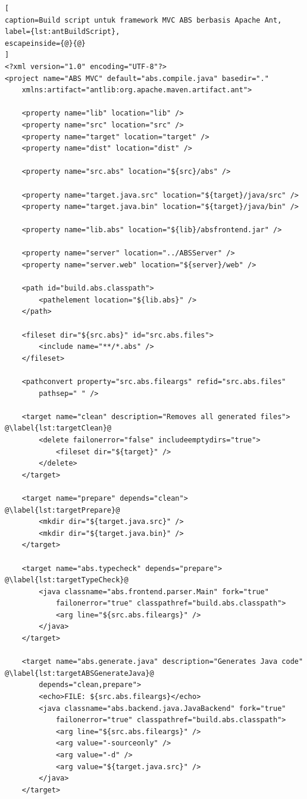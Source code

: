 \begin{lstlisting}[
caption=Build script untuk framework MVC ABS berbasis Apache Ant,
label={lst:antBuildScript},
escapeinside={@}{@}
]
<?xml version="1.0" encoding="UTF-8"?>
<project name="ABS MVC" default="abs.compile.java" basedir="."
	xmlns:artifact="antlib:org.apache.maven.artifact.ant">

	<property name="lib" location="lib" />
	<property name="src" location="src" />
	<property name="target" location="target" />
	<property name="dist" location="dist" />

	<property name="src.abs" location="${src}/abs" />
	
	<property name="target.java.src" location="${target}/java/src" />
	<property name="target.java.bin" location="${target}/java/bin" />

	<property name="lib.abs" location="${lib}/absfrontend.jar" />
	
	<property name="server" location="../ABSServer" />
	<property name="server.web" location="${server}/web" />

	<path id="build.abs.classpath">
		<pathelement location="${lib.abs}" />
	</path>

	<fileset dir="${src.abs}" id="src.abs.files">
		<include name="**/*.abs" />
	</fileset>
	
	<pathconvert property="src.abs.fileargs" refid="src.abs.files"
		pathsep=" " />
	
	<target name="clean" description="Removes all generated files"> @\label{lst:targetClean}@
		<delete failonerror="false" includeemptydirs="true">
			<fileset dir="${target}" />
		</delete>
	</target>

	<target name="prepare" depends="clean"> @\label{lst:targetPrepare}@
		<mkdir dir="${target.java.src}" />
		<mkdir dir="${target.java.bin}" />
	</target>

	<target name="abs.typecheck" depends="prepare"> @\label{lst:targetTypeCheck}@
		<java classname="abs.frontend.parser.Main" fork="true"
			failonerror="true" classpathref="build.abs.classpath">
			<arg line="${src.abs.fileargs}" />
		</java>
	</target>

	<target name="abs.generate.java" description="Generates Java code" @\label{lst:targetABSGenerateJava}@
		depends="clean,prepare">
		<echo>FILE: ${src.abs.fileargs}</echo>
		<java classname="abs.backend.java.JavaBackend" fork="true"
			failonerror="true" classpathref="build.abs.classpath">
			<arg line="${src.abs.fileargs}" />
			<arg value="-sourceonly" />
			<arg value="-d" />
			<arg value="${target.java.src}" />
		</java>
	</target>


\end{lstlisting}
